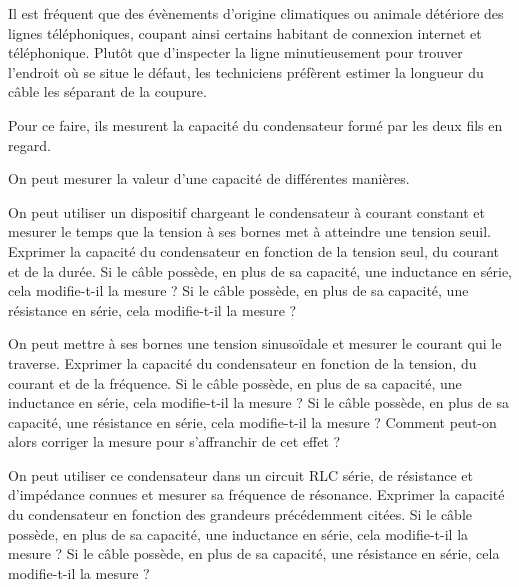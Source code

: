 

Il est fréquent que des évènements d'origine climatiques ou animale détériore des lignes téléphoniques, coupant ainsi certains habitant de connexion internet et téléphonique. Plutôt que d'inspecter la ligne minutieusement pour trouver l'endroit où se situe le défaut, les techniciens préfèrent estimer la longueur du câble les séparant de la coupure.

Pour ce faire, ils mesurent la capacité du condensateur formé par les deux fils en regard.

On peut mesurer la valeur d'une capacité de différentes manières.

\question On peut utiliser un dispositif chargeant le condensateur à courant constant et mesurer le temps que la tension à ses bornes met à atteindre une tension seuil.
\subquestion Exprimer la capacité du condensateur en fonction de la tension seul, du courant et de la durée.
\subquestion Si le câble possède, en plus de sa capacité, une inductance en série, cela modifie-t-il la mesure ?
\subquestion Si le câble possède, en plus de sa capacité, une résistance en série, cela modifie-t-il la mesure ?

\question On peut mettre à ses bornes une tension sinusoïdale et mesurer le courant qui le traverse.
\subquestion Exprimer la capacité du condensateur en fonction de la tension, du courant et de la fréquence.
\subquestion Si le câble possède, en plus de sa capacité, une inductance en série, cela modifie-t-il la mesure ?
\subquestion Si le câble possède, en plus de sa capacité, une résistance en série, cela modifie-t-il la mesure ? Comment peut-on alors corriger la mesure pour s'affranchir de cet effet ?

\question On peut utiliser ce condensateur dans un circuit RLC série, de résistance et d'impédance connues et mesurer sa fréquence de résonance.
\subquestion Exprimer la capacité du condensateur en fonction des grandeurs précédemment citées.
\subquestion Si le câble possède, en plus de sa capacité, une inductance en série, cela modifie-t-il la mesure ?
\subquestion Si le câble possède, en plus de sa capacité, une résistance en série, cela modifie-t-il la mesure ?
